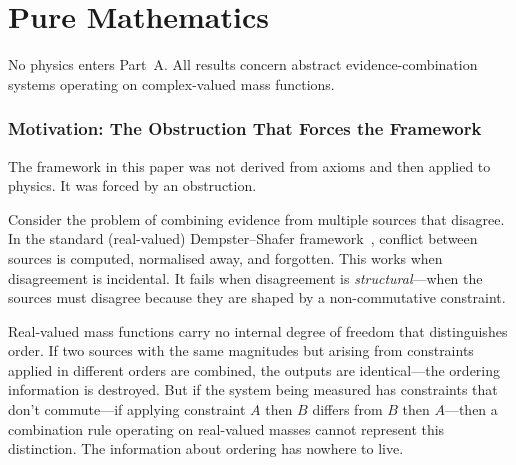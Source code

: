 \documentclass[11pt,a4paper]{article}
\theoremstyle{definition}
\theoremstyle{remark}
\newcommand{\SU}{\mathrm{SU}}
\begin{document}
\begin{abstract}
A section on numerology documents a failed attempt to connect $K^* = 7/30$ to the Barbero--Immirzi parameter, shows how the dressing is outperformed by the structurally meaningless $19/80$, and draws the diagnostic lesson: in this framework, if an answer is not exact, the relationships have not been correctly identified. There is nothing to tune.

Computational verification: $K^* = 0.2320 \pm 0.0033$ (CV $= 1.4\%$) across $105$ independent analyses spanning $\SU(2)$ and $\SU(3)$ at seven lattice sizes. 219 verification scripts. All code public: \texttt{github.com/Resout/irreducible-twistor-geometry}.
\end{abstract}

\tableofcontents
\newpage

\part{Pure Mathematics}\label{part:A}

No physics enters Part~A. All results concern abstract evidence-combination systems operating on complex-valued mass functions.

\section{Motivation: The Obstruction That Forces the Framework}\label{sec:motivation}

The framework in this paper was not derived from axioms and then applied to physics. It was forced by an obstruction.

Consider the problem of combining evidence from multiple sources that disagree. In the standard (real-valued) Dempster--Shafer framework~\cite{Dempster1967,Shafer1976}, conflict between sources is computed, normalised away, and forgotten. This works when disagreement is incidental. It fails when disagreement is \emph{structural}---when the sources must disagree because they are shaped by a non-commutative constraint.

Real-valued mass functions carry no internal degree of freedom that distinguishes order. If two sources with the same magnitudes but arising from constraints applied in different orders are combined, the outputs are identical---the ordering information is destroyed. But if the system being measured has constraints that don't commute---if applying constraint $A$ then $B$ differs from $B$ then $A$---then a combination rule operating on real-valued masses cannot represent this distinction. The information about ordering has nowhere to live.
\end{document}
